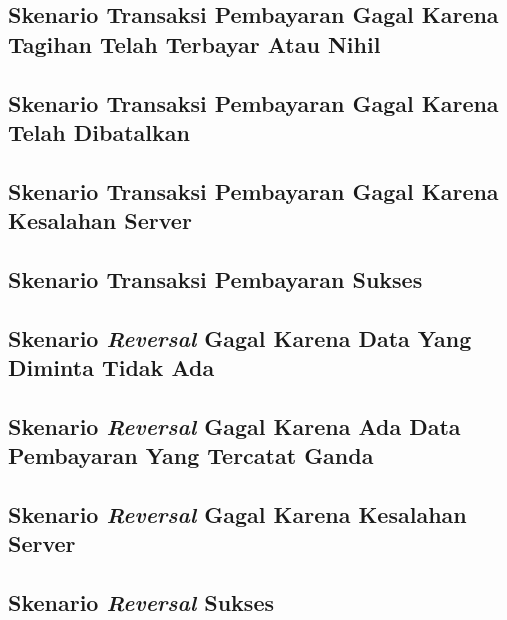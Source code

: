 \subsection{Skenario Transaksi Pembayaran Gagal Karena Tagihan Telah Terbayar Atau Nihil}
\subsection{Skenario Transaksi Pembayaran Gagal Karena Telah Dibatalkan}
\subsection{Skenario Transaksi Pembayaran Gagal Karena Kesalahan Server}
\subsection{Skenario Transaksi Pembayaran Sukses}
\subsection{Skenario \textit{Reversal} Gagal Karena Data Yang Diminta Tidak Ada}
\subsection{Skenario \textit{Reversal} Gagal Karena Ada Data Pembayaran Yang Tercatat Ganda}
\subsection{Skenario \textit{Reversal} Gagal Karena Kesalahan Server}
\subsection{Skenario \textit{Reversal} Sukses}

